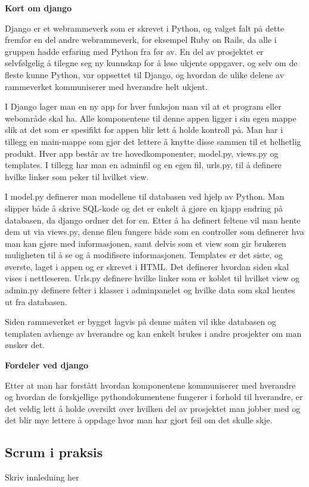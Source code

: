 \documentclass[12pt,a4paper,norsk]{article}
\begin{document}
\bigskip \noindent \textbf{Kort om django}
\par Django er et webrammeverk som er skrevet i Python, og valget falt på dette fremfor en del andre webrammeverk, for eksempel Ruby on Rails, da alle i gruppen hadde erfaring med Python fra før av. En del av prosjektet er selvfølgelig å tilegne seg ny kunnskap for å løse ukjente oppgaver, og selv om de fleste kunne Python, var oppsettet til Django, og hvordan de ulike delene av rammeverket kommuniserer med hverandre helt ukjent.

I Django lager man en ny app for hver funksjon man vil at et program eller webområde skal ha. Alle komponentene til denne appen ligger i sin egen mappe slik at det som er spesifikt for appen blir lett å holde kontroll på. Man har i tillegg en main-mappe som gjør det lettere å knytte disse sammen til et helhetlig produkt. Hver app består av tre hovedkomponenter, model.py, views.py og templates. I tillegg har man en adminfil og en egen fil, urls.py, til å definere hvilke linker som peker til hvilket view.

I model.py definerer man modellene til databasen ved hjelp av Python. Man slipper både å skrive SQL-kode og det er enkelt å gjøre en kjapp endring på databasen, da django ordner det for en. Etter å ha definert feltene vil man hente dem ut via views.py, denne filen fungere både som en controller som definerer hva man kan gjøre med informasjonen, samt delvis som et view som gir brukeren muligheten til å se og å modifisere informasjonen. Templates er det siste, og øverste, laget i appen og er skrevet i HTML. Det definerer hvordan siden skal vises i nettleseren. Urls.py definere hvilke linker som er koblet til hvilket view og admin.py definere felter i klasser i adminpanelet og hvilke data som skal hentes ut fra databasen.

Siden rammeverket er bygget lagvis på denne måten vil ikke databasen og templaten avhenge av hverandre og kan enkelt brukes i andre prosjekter om man ønsker det. 

\bigskip \noindent \textbf{Fordeler ved django}
\par Etter at man har forstått hvordan komponentene kommuniserer med hverandre og hvordan de forskjellige pythondokumentene fungerer i forhold til hverandre, er det veldig lett å holde oversikt over hvilken del av prosjektet man jobber med og det blir mye lettere å oppdage hvor man har gjort feil om det skulle skje.

	\subsection{Scrum i praksis}
	Skriv innledning her
	
\end{document}

